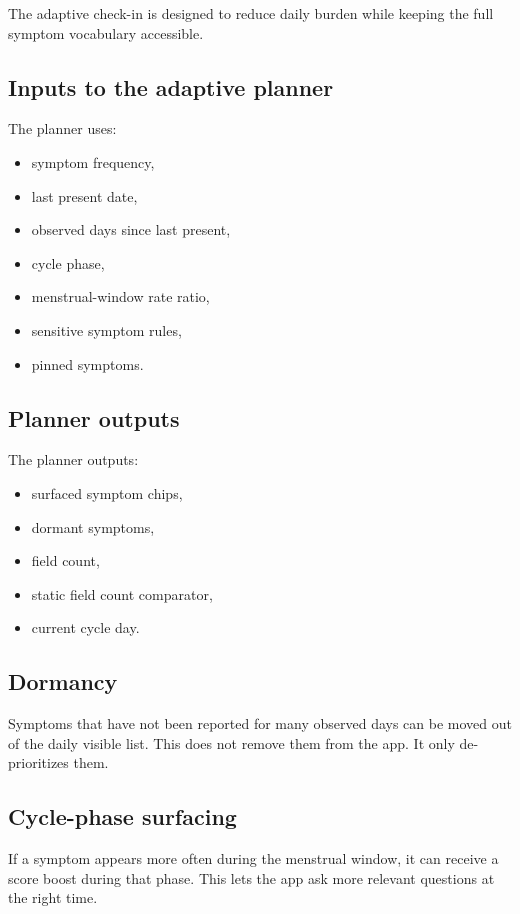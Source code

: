 \documentclass[11pt,a4paper]{article}
\begin{document}
The adaptive check-in is designed to reduce daily burden while keeping the full symptom vocabulary accessible.

\subsection{Inputs to the adaptive planner}

The planner uses:

\begin{itemize}
  \item symptom frequency,
  \item last present date,
  \item observed days since last present,
  \item cycle phase,
  \item menstrual-window rate ratio,
  \item sensitive symptom rules,
  \item pinned symptoms.
\end{itemize}

\subsection{Planner outputs}

The planner outputs:

\begin{itemize}
  \item surfaced symptom chips,
  \item dormant symptoms,
  \item field count,
  \item static field count comparator,
  \item current cycle day.
\end{itemize}

\subsection{Dormancy}

Symptoms that have not been reported for many observed days can be moved out of the daily visible list. This does not remove them from the app. It only de-prioritizes them.

\subsection{Cycle-phase surfacing}

If a symptom appears more often during the menstrual window, it can receive a score boost during that phase. This lets the app ask more relevant questions at the right time.
\end{document}
